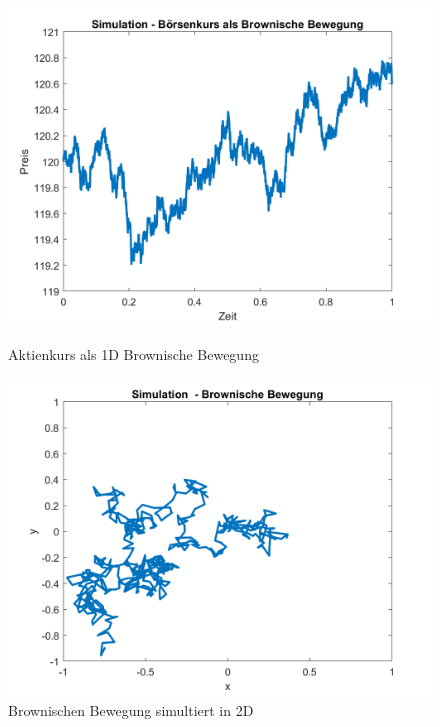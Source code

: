 \begin{figure}
	\centering
	\begin{minipage}{0.45\textwidth}
		\centering
		\includegraphics[width=\linewidth]{papers/brown/images/Aktienkurs-als-Brownische-Bewegung_3.png}
		\caption{Aktienkurs als 1D Brownische Bewegung}
		\label{1Dbrownian}
	\end{minipage}
	\hspace{0.05\linewidth}
	\begin{minipage}{0.45\textwidth}
		\centering
		\includegraphics[width=\linewidth]{papers/brown/images/Brownische-Bewegung-Simuliert_3.png}
		\caption{Brownischen Bewegung simultiert in 2D}
		\label{2Dbrownian}
	\end{minipage}
\end{figure}

